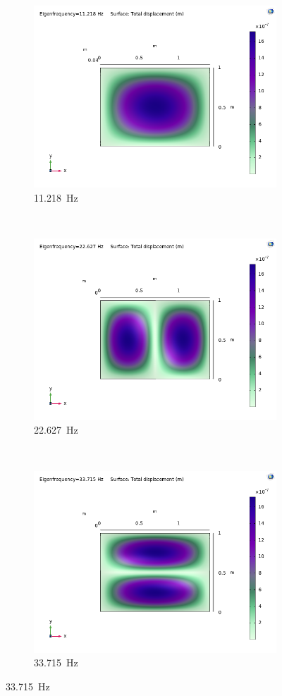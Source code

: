 \documentclass[a4paper]{article}
\begin{document}
\begin{figure}[h]
	\centering
	\begin{subfigure}[b]{0.31\linewidth}
		\includegraphics[width=0.9\linewidth]{comsol/1ss.png}
		\caption*{\SI{11.218}{\hertz}}
	\end{subfigure}
	~
	\begin{subfigure}[b]{0.31\linewidth}
		\includegraphics[width=0.9\linewidth]{comsol/2ss.png}
		\caption*{\SI{22.627}{\hertz}}
	\end{subfigure}
	~
	\begin{subfigure}[b]{0.31\linewidth}
		\includegraphics[width=0.9\linewidth]{comsol/3ss.png}
		\caption*{\SI{33.715}{\hertz}}
	\end{subfigure}


\end{figure}
\end{document}
